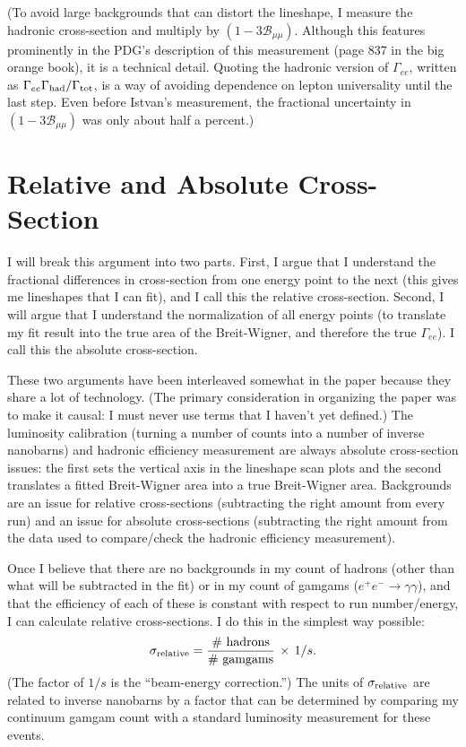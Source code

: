 \documentclass[12pt]{article}
\begin{document}
(To avoid large backgrounds that can distort the lineshape, I measure
the hadronic cross-section and multiply by $(1 -
3\mathcal{B}_{\mu\mu})$.  Although this features prominently in the
PDG's description of this measurement (page 837 in the big orange
book), it is a technical detail.  Quoting the hadronic version of
$\Gamma_{ee}$, written as
$\Gamma_{ee}\Gamma_{\mbox{\scriptsize had}}/\Gamma_{\mbox{\scriptsize tot}}$, is a way of avoiding
dependence on lepton universality until the last step.  Even before
Istvan's measurement, the fractional uncertainty in $(1 -
3\mathcal{B}_{\mu\mu})$ was only about half a percent.)

\section{Relative and Absolute Cross-Section}

I will break this argument into two parts.  First, I argue that I
understand the fractional differences in cross-section from one energy
point to the next (this gives me lineshapes that I can fit), and I
call this the relative cross-section.  Second, I will argue that I
understand the normalization of all energy points (to translate my fit
result into the true area of the Breit-Wigner, and therefore the true
$\Gamma_{ee}$).  I call this the absolute cross-section.

These two arguments have been interleaved somewhat in the paper
because they share a lot of technology.  (The primary consideration in
organizing the paper was to make it causal: I must never use terms
that I haven't yet defined.)  The luminosity calibration (turning a
number of counts into a number of inverse nanobarns) and hadronic
efficiency measurement are always absolute cross-section issues: the
first sets the vertical axis in the lineshape scan plots and the
second translates a fitted Breit-Wigner area into a true Breit-Wigner
area.  Backgrounds are an issue for relative cross-sections
(subtracting the right amount from every run) and an issue for
absolute cross-sections (subtracting the right amount from the data
used to compare/check the hadronic efficiency measurement).

Once I believe that there are no backgrounds in my count of hadrons
(other than what will be subtracted in the fit) or in my count of
gamgams ($e^+e^- \to \gamma\gamma$), and that the efficiency of each
of these is constant with respect to run number/energy, I can
calculate relative cross-sections.  I do this in the simplest way
possible:
\begin{equation}
  \sigma_{\mbox{\scriptsize relative}} = \frac{\mbox{\# hadrons}}{\mbox{\# gamgams}}
  \, \times \, 1/s\mbox{.} \label{o_great_equation}
\end{equation}
(The factor of $1/s$ is the ``beam-energy correction.'')  The units of
$\sigma_{\mbox{\scriptsize relative}}$ are related to inverse nanobarns by a factor
that can be determined by comparing my continuum gamgam count with a
standard luminosity measurement for these events.
\end{document}
